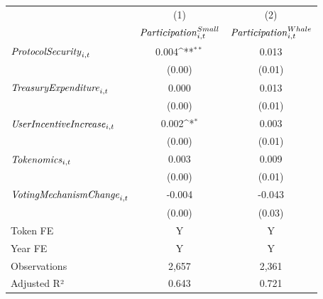 {
\def\sym#1{\ifmmode^{#1}\else\(^{#1}\)\fi}
\begin{tabular}{l*{2}{c}}
\toprule
                    &\multicolumn{1}{c}{(1)}&\multicolumn{1}{c}{(2)}\\
                    &\multicolumn{1}{c}{${\it Participation}^{Small}_{i,t}$}&\multicolumn{1}{c}{${\it Participation}^{Whale}_{i,t}$}\\
\midrule
${\it Protocol Security}_{i,t}$&       0.004\sym{**} &       0.013         \\
                    &      (0.00)         &      (0.01)         \\
${\it Treasury Expenditure}_{i,t}$&       0.000         &       0.013         \\
                    &      (0.00)         &      (0.01)         \\
${\it User Incentive Increase}_{i,t}$&       0.002\sym{*}  &       0.003         \\
                    &      (0.00)         &      (0.01)         \\
${\it Tokenomics}_{i,t}$&       0.003         &       0.009         \\
                    &      (0.00)         &      (0.01)         \\
${\it Voting Mechanism Change}_{i,t}$&      -0.004         &      -0.043         \\
                    &      (0.00)         &      (0.03)         \\
\midrule
Token FE            &           Y         &           Y         \\
Year FE             &           Y         &           Y         \\
Observations        &       2,657         &       2,361         \\
Adjusted R²         &       0.643         &       0.721         \\
\bottomrule
\end{tabular}
}
